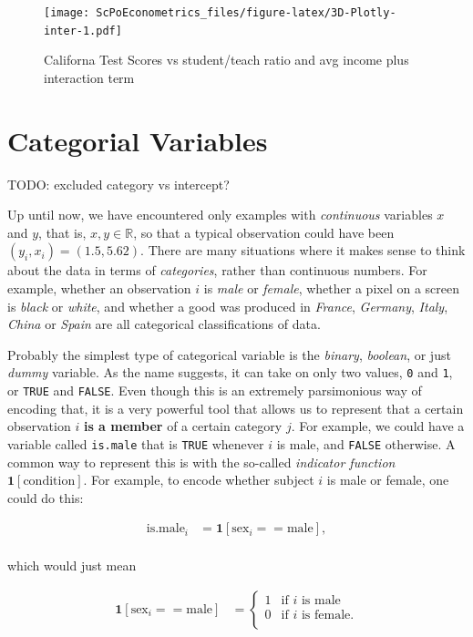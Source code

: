 \documentclass[]{book}
\theoremstyle{definition}
\theoremstyle{definition}
\theoremstyle{definition}
\theoremstyle{remark}
\begin{document}
\begin{figure}
\centering
\texttt{[image: ScPoEconometrics\_files/figure-latex/3D-Plotly-inter-1.pdf]}
\caption{\label{fig:3D-Plotly-inter}Californa Test Scores vs student/teach
ratio and avg income plus interaction term}
\end{figure}

\chapter{Categorial Variables}\label{categorical-vars}

TODO: excluded category vs intercept?

Up until now, we have encountered only examples with \emph{continuous}
variables \(x\) and \(y\), that is, \(x,y \in \mathbb{R}\), so that a
typical observation could have been \((y_i,x_i) = (1.5,5.62)\). There
are many situations where it makes sense to think about the data in
terms of \emph{categories}, rather than continuous numbers. For example,
whether an observation \(i\) is \emph{male} or \emph{female}, whether a
pixel on a screen is \emph{black} or \emph{white}, and whether a good
was produced in \emph{France}, \emph{Germany}, \emph{Italy},
\emph{China} or \emph{Spain} are all categorical classifications of
data.

Probably the simplest type of categorical variable is the \emph{binary},
\emph{boolean}, or just \emph{dummy} variable. As the name suggests, it
can take on only two values, \texttt{0} and \texttt{1}, or \texttt{TRUE}
and \texttt{FALSE}. Even though this is an extremely parsimonious way of
encoding that, it is a very powerful tool that allows us to represent
that a certain observation \(i\) \textbf{is a member} of a certain
category \(j\). For example, we could have a variable called
\texttt{is.male} that is \texttt{TRUE} whenever \(i\) is male, and
\texttt{FALSE} otherwise. A common way to represent this is with the
so-called \emph{indicator function} \(\mathbf{1}[\text{condition}]\).
For example, to encode whether subject \(i\) is male or female, one
could do this:

\begin{align*}
\text{is.male}_i &= \mathbf{1}[\text{sex}_i==\text{male}], \\
\end{align*}

which would just mean

\begin{align*}
\mathbf{1}[\text{sex}_i==\text{male}] &= \begin{cases}
                    1 & \text{if }i\text{ is male} \\
                    0 & \text{if }i\text{ is female}. \\
                 \end{cases}
\end{align*}
\end{document}
